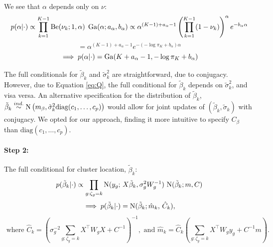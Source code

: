 {We see that $\alpha$ depends only on $\nu$:
\begin{equation}
    p(\alpha|\cdot) \propto \prod_{k=1}^{K-1} \operatorname{Be}(\nu_k;1, \alpha) \; \operatorname{Ga}(\alpha;a_\alpha,b_\alpha)
\propto \alpha^{(K-1) + a_\alpha - 1} \left(\prod_{k=1}^{K-1} (1-\nu_k)\right)^\alpha e^{-b_\alpha \alpha} 
  \end{equation}
  \begin{equation*}
    = \alpha^{(K-1) + a_\alpha - 1} e^{-(-\log \pi_K + b_\alpha) \alpha}
  \end{equation*}
  \begin{equation*}
    \implies p(\alpha|\cdot) = \operatorname{Ga}(K + a_\alpha - 1, -\log \pi_K + b_\alpha)
  \end{equation*}



The full conditionals for $\tilde{\beta}_k$ and $\tilde{\sigma}^2_k$ are straightforward, due to conjugacy. However, due to Equation \ref{eq:Q}, the full conditional for $\tilde{\beta}_k$ depends on $\tilde{\sigma}^2_k$, and visa versa. An alternative specification for the distribution of $\tilde{\beta}_k$, $\tilde{\beta}_k \stackrel{ind.}{\sim} \operatorname{N}\left(m_\beta, \tilde{\sigma}^2_k \mbox{diag}(c_1,\ldots,c_p)\right)$ would allow for joint updates of $(\tilde{\beta}_k,\tilde{\sigma}_k)$ with conjugacy. We opted for our approach, finding it more intuitive to specify $C_\beta$ than $\mbox{diag}(c_1,\ldots,c_p)$.

\paragraph{Step 2:} 
The full conditional for cluster location, $\tilde{\beta}_k$:
    \begin{equation}
      p(\tilde{\beta}_k|\cdot) \propto \prod_{g:\zeta_g=k} \operatorname{N}(y_g;\,X\tilde{\beta}_k, \sigma^2_gW^{-1}_g)\,\operatorname{N}(\tilde{\beta}_k; m, C)
    \end{equation}
    \begin{equation*}
      \implies p(\tilde{\beta}_k|\cdot) = \operatorname{N}(\tilde{\beta}_k; \hat{m}_k,\, \hat{C}_k),
    \end{equation*}
    \begin{equation*}
    \mbox{ where }\hat{C}_k= \left( \sigma^{-2}_g\sum_{g:\zeta_g=k}
      X^\top W_g X + C^{-1} \right)^{-1}, \mbox{ and
    }\hat{m}_k=\hat{C}_k \left(\sum_{g:\zeta_g=k} X^\top W_g y_g +
      C^{-1}m \right).
    \end{equation*}
}
